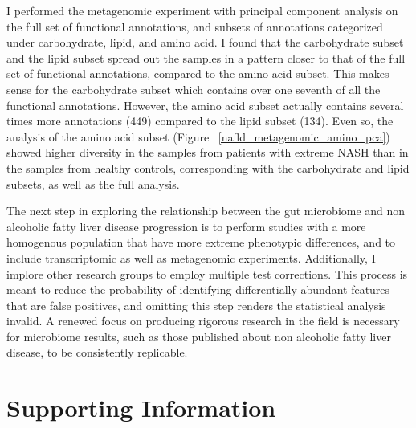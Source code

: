 I performed the metagenomic experiment with principal component analysis on the full set of functional annotations, and subsets of annotations categorized under carbohydrate, lipid, and amino acid. I found that the carbohydrate subset and the lipid subset spread out the samples in a pattern closer to that of the full set of functional annotations, compared to the amino acid subset. This makes sense for the carbohydrate subset which contains over one seventh of all the functional annotations. However, the amino acid subset actually contains several times more annotations (449) compared to the lipid subset (134). Even so, the analysis of the amino acid subset (Figure ~\ref{nafld_metagenomic_amino_pca}) showed higher diversity in the samples from patients with extreme NASH than in the samples from healthy controls, corresponding with the carbohydrate and lipid subsets, as well as the full analysis.

The next step in exploring the relationship between the gut microbiome and non alcoholic fatty liver disease progression is to perform studies with a more homogenous population that have more extreme phenotypic differences, and to include transcriptomic as well as metagenomic experiments. Additionally, I implore other research groups to employ multiple test corrections. This process is meant to reduce the probability of identifying differentially abundant features that are false positives, and omitting this step renders the statistical analysis invalid. A renewed focus on producing rigorous research in the field is necessary for microbiome results, such as those published about non alcoholic fatty liver disease, to be consistently replicable.

\section*{{Supporting Information}}

